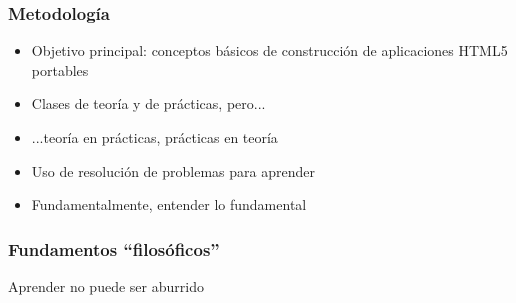
\begin{frame}
\frametitle{Metodología}

{\Large
\begin{itemize}
\item Objetivo principal: conceptos básicos de construcción de aplicaciones HTML5 portables
\item Clases de teoría y de prácticas, pero...
\item ...teoría en prácticas, prácticas en teoría
\item Uso de resolución de problemas para aprender
\item Fundamentalmente, entender lo fundamental
\end{itemize}
}

\end{frame}


\begin{frame}
\frametitle{Fundamentos ``filosóficos''}

\vspace{5.4cm}

\begin{center}
\Huge Aprender no puede ser aburrido
\end{center}

\end{frame}
\usebackgroundtemplate{}


